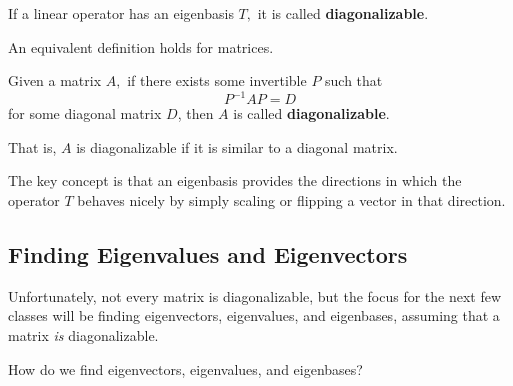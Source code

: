 \begin{definition}
If a linear operator has an eigenbasis $T,$ it is called \textbf{diagonalizable}.
\end{definition}

An equivalent definition holds for matrices.

\begin{definition}
Given a matrix $A,$ if there exists some invertible $P$ such that \[P^{-1}AP = D\] for some diagonal matrix $D$, then $A$ is called \textbf{diagonalizable}.
\end{definition}

That is, $A$ is diagonalizable if it is similar to a diagonal matrix. 

The key concept is that an eigenbasis provides the directions in which the operator $T$ behaves nicely by simply scaling or flipping a vector in that direction.
\subsection{Finding Eigenvalues and Eigenvectors}
 Unfortunately, not every matrix is diagonalizable, but the focus for the next few classes will be finding eigenvectors, eigenvalues, and eigenbases, assuming that a matrix \emph{is} diagonalizable.

\begin{qq}
How do we find eigenvectors, eigenvalues, and eigenbases?
\end{qq}

